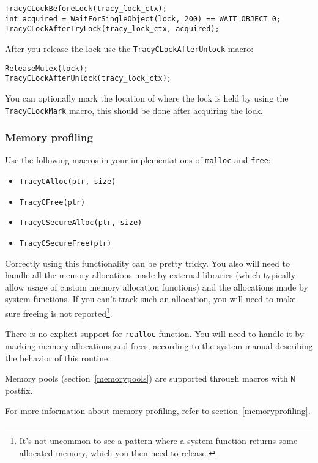 \documentclass[hidelinks,titlepage,a4paper,twoside]{article}
\begin{document}
\begin{lstlisting}
TracyCLockBeforeLock(tracy_lock_ctx);
int acquired = WaitForSingleObject(lock, 200) == WAIT_OBJECT_0;
TracyCLockAfterTryLock(tracy_lock_ctx, acquired);
\end{lstlisting}

After you release the lock use the \texttt{TracyCLockAfterUnlock} macro:

\begin{lstlisting}
ReleaseMutex(lock);
TracyCLockAfterUnlock(tracy_lock_ctx);
\end{lstlisting}

You can optionally mark the location of where the lock is held by using the \texttt{TracyCLockMark} macro, this should be done after acquiring the lock.

\subsubsection{Memory profiling}
\label{cmemoryprofiling}

Use the following macros in your implementations of \texttt{malloc} and \texttt{free}:

\begin{itemize}
\item \texttt{TracyCAlloc(ptr, size)}
\item \texttt{TracyCFree(ptr)}
\item \texttt{TracyCSecureAlloc(ptr, size)}
\item \texttt{TracyCSecureFree(ptr)}
\end{itemize}

Correctly using this functionality can be pretty tricky. You also will need to handle all the memory allocations made by external libraries (which typically allow usage of custom memory allocation functions) and the allocations made by system functions. If you can't track such an allocation, you will need to make sure freeing is not reported\footnote{It's not uncommon to see a pattern where a system function returns some allocated memory, which you then need to release.}.

There is no explicit support for \texttt{realloc} function. You will need to handle it by marking memory allocations and frees, according to the system manual describing the behavior of this routine.

Memory pools (section~\ref{memorypools}) are supported through macros with \texttt{N} postfix.

For more information about memory profiling, refer to section~\ref{memoryprofiling}.
\end{document}
